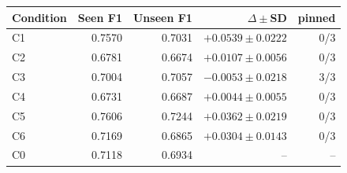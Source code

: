 \begin{tabular}{lrrrr}
\toprule
Condition & Seen F1 & Unseen F1 & $\Delta\pm$SD & pinned \\
\midrule
C1 & 0.7570 & 0.7031 & $+0.0539 \pm 0.0222$ & 0/3 \\
C2 & 0.6781 & 0.6674 & $+0.0107 \pm 0.0056$ & 0/3 \\
C3 & 0.7004 & 0.7057 & $-0.0053 \pm 0.0218$ & 3/3 \\
C4 & 0.6731 & 0.6687 & $+0.0044 \pm 0.0055$ & 0/3 \\
C5 & 0.7606 & 0.7244 & $+0.0362 \pm 0.0219$ & 0/3 \\
C6 & 0.7169 & 0.6865 & $+0.0304 \pm 0.0143$ & 0/3 \\
C0 & 0.7118 & 0.6934 & $\text{--}$ & -- \\
\bottomrule
\end{tabular}
